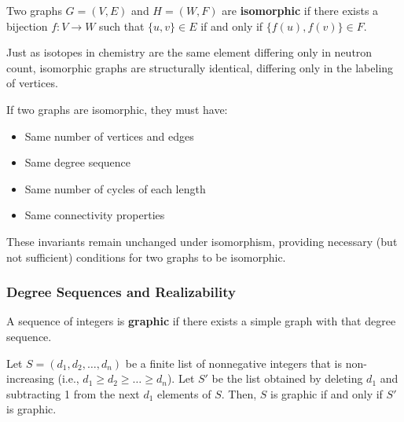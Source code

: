 \begin{definition}
Two graphs $G = (V, E)$ and $H = (W, F)$ are \textbf{isomorphic} if there exists a bijection $f: V \to W$ such that $\{u, v\} \in E$ if and only if $\{f(u), f(v)\} \in F$.
\end{definition}

Just as isotopes in chemistry are the same element differing only in neutron count, isomorphic graphs are structurally identical, differing only in the labeling of vertices.

\begin{theorem}
If two graphs are isomorphic, they must have:
\begin{itemize}
    \item Same number of vertices and edges
    \item Same degree sequence
    \item Same number of cycles of each length
    \item Same connectivity properties
\end{itemize}
\end{theorem}

These invariants remain unchanged under isomorphism, providing necessary (but not sufficient) conditions for two graphs to be isomorphic.

\subsubsection{Degree Sequences and Realizability}
A sequence of integers is \textbf{graphic} if there exists a simple graph with that degree sequence.

\begin{theorem}
Let $S = (d_1, d_2, \dots, d_n)$ be a finite list of nonnegative integers that is non-increasing (i.e., $d_1 \ge d_2 \ge \dots \ge d_n$). Let $S'$ be the list obtained by deleting $d_1$ and subtracting 1 from the next $d_1$ elements of $S$. Then, $S$ is graphic if and only if $S'$ is graphic.
\end{theorem}

